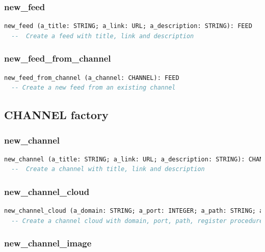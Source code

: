\subsubsection{new\_feed}

\begin{lstlisting}[language=Eiffel]
new_feed (a_title: STRING; a_link: URL; a_description: STRING): FEED
  --  Create a feed with title, link and description
\end{lstlisting}


\subsubsection{new\_feed\_from\_channel}

\begin{lstlisting}[language=Eiffel]
new_feed_from_channel (a_channel: CHANNEL): FEED
  -- Create a new feed from an existing channel
\end{lstlisting}


\subsection{CHANNEL factory}
\label{sec:syndication-factory-channel}

\subsubsection{new\_channel}

\begin{lstlisting}[language=Eiffel]
new_channel (a_title: STRING; a_link: URL; a_description: STRING): CHANNEL
  --  Create a channel with title, link and description
\end{lstlisting}


\subsubsection{new\_channel\_cloud}

\begin{lstlisting}[language=Eiffel]
new_channel_cloud (a_domain: STRING; a_port: INTEGER; a_path: STRING; a_register_procedure: STRING; a_protocol: STRING): CHANNEL_CLOUD
  -- Create a channel cloud with domain, port, path, register procedure and protocol
\end{lstlisting}


\subsubsection{new\_channel\_image}

